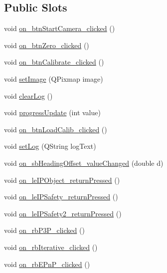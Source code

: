 \subsection*{Public Slots}
\begin{DoxyCompactItemize}
\item 
void \hyperlink{class_rigid_track_a2f226856e28868c8bb1854fa16531f60}{on\+\_\+btn\+Start\+Camera\+\_\+clicked} ()
\item 
void \hyperlink{class_rigid_track_afb1a4edcacc818db4ec6bb017dd07e0f}{on\+\_\+btn\+Zero\+\_\+clicked} ()
\item 
void \hyperlink{class_rigid_track_aed2c39da404909142074f7dd2ce75a63}{on\+\_\+btn\+Calibrate\+\_\+clicked} ()
\item 
void \hyperlink{class_rigid_track_a3b0b3835204cad40abdb144d24aefc76}{set\+Image} (Q\+Pixmap image)
\item 
void \hyperlink{class_rigid_track_a6c99fedc157054f4fb752309457fa848}{clear\+Log} ()
\item 
void \hyperlink{class_rigid_track_a9d229d23fdf40b988a1743accb695ea8}{progress\+Update} (int value)
\item 
void \hyperlink{class_rigid_track_a2224d3f6d923a1c7bad356f49d7a4124}{on\+\_\+btn\+Load\+Calib\+\_\+clicked} ()
\item 
void \hyperlink{class_rigid_track_a54a029af74a21f92749e99df7ed847b2}{set\+Log} (Q\+String log\+Text)
\item 
void \hyperlink{class_rigid_track_a72e338d6bf93d0efa3bc503f7ca736c5}{on\+\_\+sb\+Heading\+Offset\+\_\+value\+Changed} (double d)
\item 
void \hyperlink{class_rigid_track_a9f037a061b2577815fc80e5e9f8d46d9}{on\+\_\+le\+I\+P\+Object\+\_\+return\+Pressed} ()
\item 
void \hyperlink{class_rigid_track_aa527ab3a2ddc7b31bf1063260efc9755}{on\+\_\+le\+I\+P\+Safety\+\_\+return\+Pressed} ()
\item 
void \hyperlink{class_rigid_track_a555c536593d659b940de43cd2db8d6c1}{on\+\_\+le\+I\+P\+Safety2\+\_\+return\+Pressed} ()
\item 
void \hyperlink{class_rigid_track_ac1f10ea5ec3f718c152e245a04776454}{on\+\_\+rb\+P3\+P\+\_\+clicked} ()
\item 
void \hyperlink{class_rigid_track_ae5bcdd3fb7203b4a7d1fa97c1460af31}{on\+\_\+rb\+Iterative\+\_\+clicked} ()
\item 
void \hyperlink{class_rigid_track_a19bc46333f946e589184eeed998160da}{on\+\_\+rb\+E\+Pn\+P\+\_\+clicked} ()
\item 

\end{DoxyCompactItemize}
